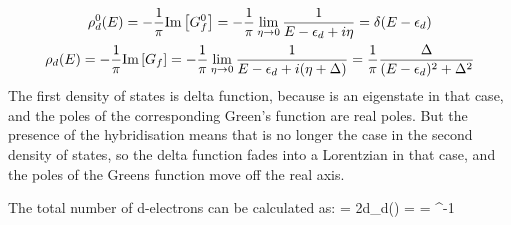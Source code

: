 \documentclass[14pt]{extarticle}
\numberwithin{equation}{section}
\begin{document}
\begin{gather}
	\rho_d^0(E) = -\frac{1}{\pi}\text{Im}\left[{G^0_f}\right] = -\frac{1}{\pi} \lim_{\eta \rightarrow 0} \frac{1}{E - \epsilon_d + i\eta} = \delta(E - \epsilon_d)\\
	\rho_d(E) = -\frac{1}{\pi}\text{Im}\left[{G_f}\right]= -\frac{1}{\pi} \lim_{\eta \rightarrow 0} \frac{1}{E - \epsilon_d + i(\eta+\Delta)} = \frac{1}{\pi}\frac{\Delta}{(E-\epsilon_d)^2 + \Delta^2}\label{densitys}
\end{gather}
The first density of states is delta function, because  is an eigenstate in that case, and the poles of the corresponding Green's function are real poles. But the presence of the hybridisation means that is no longer the case in the second density of states, so the delta function fades into a Lorentzian in that case, and the poles of the Greens function move off the real axis.

The total number of d-electrons can be calculated as:
\beq[total]
 = 2\int d\epsilon \rho_d(\epsilon) = \fr{2\Delta}{\pi} \int {} = \cot^{-1}
\eeq
\end{document}

